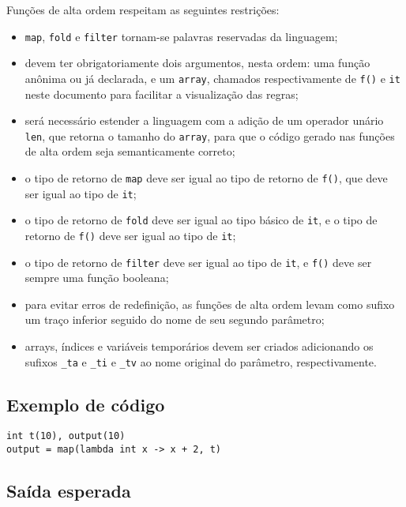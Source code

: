 \documentclass{article}
\newenvironment{smallitem}{
    \vspace{-1mm}
    \begin{itemize}
    \setlength{\parskip}{0pt}
    \setlength{\itemsep}{2pt}
}{
    \vspace{-2mm}
    \end{itemize}
}
\begin{document}
Funções de alta ordem respeitam as seguintes restrições:
\begin{smallitem}
    \item \texttt{map}, \texttt{fold} e \texttt{filter} tornam-se palavras
        reservadas da linguagem;
    \item devem ter obrigatoriamente dois argumentos, nesta ordem: uma função
        anônima ou já declarada, e um \texttt{array}, chamados respectivamente
        de \texttt{f()} e \texttt{it} neste documento para facilitar a
        visualização das regras;
    \item será necessário estender a linguagem com a adição de um operador
        unário \texttt{len}, que retorna o tamanho do \texttt{array}, para que
        o código gerado nas funções de alta ordem seja semanticamente correto;
    \item o tipo de retorno de \texttt{map} deve ser igual ao tipo de retorno
        de \texttt{f()}, que deve ser igual ao tipo de \texttt{it};
    \item o tipo de retorno de \texttt{fold} deve ser igual ao tipo básico de
        \texttt{it}, e o tipo de retorno de \texttt{f()} deve ser igual ao
        tipo de \texttt{it};
    \item o tipo de retorno de \texttt{filter} deve ser igual ao tipo de
        \texttt{it}, e \texttt{f()} deve ser sempre uma função booleana;
    \item para evitar erros de redefinição, as funções de alta ordem levam
        como sufixo um traço inferior seguido do nome de seu segundo parâmetro;
    \item arrays, índices e variáveis temporários devem ser criados adicionando
        os sufixos \texttt{\_ta} e \texttt{\_ti} e \texttt{\_tv} ao nome original
        do parâmetro, respectivamente.
\end{smallitem}

\subsection{Exemplo de código}

\begin{verbatim}
int t(10), output(10)
output = map(lambda int x -> x + 2, t)
\end{verbatim}

\subsection{Saída esperada}
\end{document}
